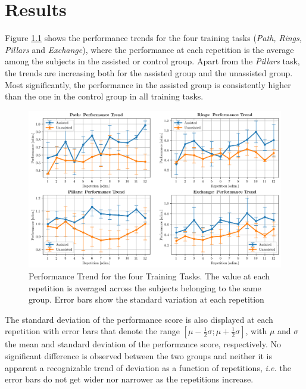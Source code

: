 \documentclass[../main.tex]{subfiles}
\begin{document}
\chapter{Results}

Figure \ref{fig:performancetraining} shows the performance trends for the four training tasks (\textit{Path, Rings, Pillars} and \textit{Exchange}), where the performance at each repetition is the average among the subjects in the assisted or control group. Apart from the \textit{Pillars} task, the trends are increasing both for the assisted group and the unassisted group. Most significantly, the performance in the assisted group is consistently higher than the one in the control group in all training tasks. 

\begin{figure}
    \centering
    \includegraphics[width=\textwidth]{images/performance_training.png}
    \caption{Performance Trend for the four Training Tasks. The value at each repetition is averaged across the subjects belonging to the same group. Error bars show the standard variation at each repetition}
    \label{fig:performancetraining}
\end{figure}

The standard deviation of the performance score is also displayed at each repetition with error bars that denote the range $\left[\mu - \frac{1}{2}\sigma; \mu + \frac{1}{2}\sigma\right]$, with $\mu$ and $\sigma$ the mean and standard deviation of the performance score, respectively. No significant difference is observed between the two groups and neither it is apparent a recognizable trend of deviation as a function of repetitions, \textit{i.e.} the error bars do not get wider nor narrower as the repetitions increase.
\end{document}
